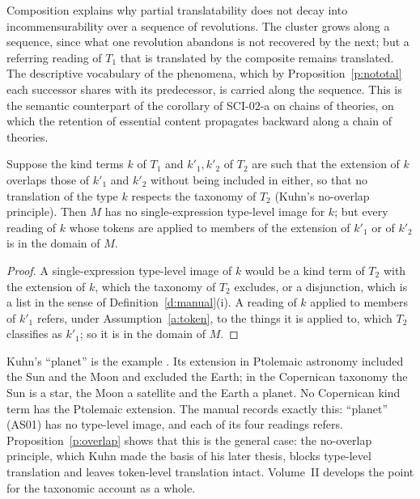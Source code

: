 \documentclass{situationist-preprint}
\begin{document}
Composition explains why partial translatability does not decay into incommensurability over a sequence of revolutions. The cluster grows along a sequence, since what one revolution abandons is not recovered by the next; but a referring reading of $T_1$ that is translated by the composite remains translated. The descriptive vocabulary of the phenomena, which by Proposition~\ref{p:nototal} each successor shares with its predecessor, is carried along the sequence. This is the semantic counterpart of the corollary of SCI-02-a on chains of theories, on which the retention of essential content propagates backward along a chain of theories.

\begin{proposition}\label{p:overlap}
Suppose the kind terms $k$ of $T_1$ and $k'_1, k'_2$ of $T_2$ are such that the extension of $k$ overlaps those of $k'_1$ and $k'_2$ without being included in either, so that no translation of the type $k$ respects the taxonomy of $T_2$ (Kuhn's no-overlap principle). Then $M$ has no single-expression type-level image for $k$; but every reading of $k$ whose tokens are applied to members of the extension of $k'_1$ or of $k'_2$ is in the domain of $M$.
\end{proposition}

\begin{proof}
A single-expression type-level image of $k$ would be a kind term of $T_2$ with the extension of $k$, which the taxonomy of $T_2$ excludes, or a disjunction, which is a list in the sense of Definition~\ref{d:manual}(i). A reading of $k$ applied to members of $k'_1$ refers, under Assumption~\ref{a:token}, to the things it is applied to, which $T_2$ classifies as $k'_1$; so it is in the domain of $M$.
\end{proof}

Kuhn's \enquote{planet} is the example \citep{Kuhn1991}. Its extension in Ptolemaic astronomy included the Sun and the Moon and excluded the Earth; in the Copernican taxonomy the Sun is a star, the Moon a satellite and the Earth a planet. No Copernican kind term has the Ptolemaic extension. The manual records exactly this: \enquote{planet} (AS01) has no type-level image, and each of its four readings refers. Proposition~\ref{p:overlap} shows that this is the general case: the no-overlap principle, which Kuhn made the basis of his later thesis, blocks type-level translation and leaves token-level translation intact. Volume~II develops the point for the taxonomic account as a whole.
\end{document}
